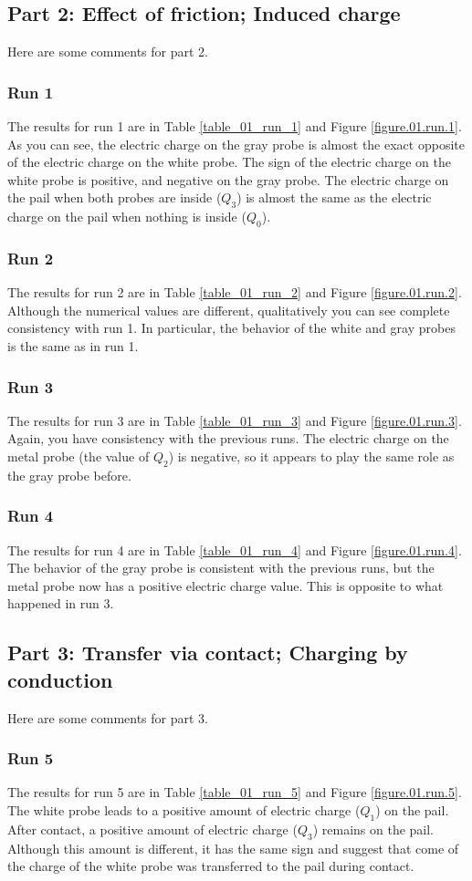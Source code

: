 \subsection{Part 2: Effect of friction; Induced charge}
%
Here are some comments for part 2.
%
\subsubsection{Run 1}
%
The results for run 1 are in Table \ref{table_01_run_1} and Figure \ref{figure.01.run.1}. As you can see, the electric charge on the gray probe is almost the exact opposite of the electric charge on the white probe. The sign of the electric charge on the white probe is positive, and negative on the gray probe. The electric charge on the pail when both probes are inside ($Q_{3}$) is almost the same as the electric charge on the pail when nothing is inside ($Q_{0}$).
%
\subsubsection{Run 2}
%
The results for run 2 are in Table \ref{table_01_run_2} and Figure \ref{figure.01.run.2}. Although the numerical values are different, qualitatively you can see complete consistency with run 1. In particular, the behavior of the white and gray probes is the same as in run 1.
%
\subsubsection{Run 3}
%
The results for run 3 are in Table \ref{table_01_run_3} and Figure \ref{figure.01.run.3}. Again, you have consistency with the previous runs. The electric charge on the metal probe (the value of $Q_{2}$) is negative, so it appears to play the same role as the gray probe before.
%
\subsubsection{Run 4}
%
The results for run 4 are in Table \ref{table_01_run_4} and Figure \ref{figure.01.run.4}. The behavior of the gray probe is consistent with the previous runs, but the metal probe now has a positive electric charge value. This is opposite to what happened in run 3.
%
\subsection{Part 3: Transfer via contact; Charging by conduction}
%
Here are some comments for part 3.
%
\subsubsection{Run 5}
%
The results for run 5 are in Table \ref{table_01_run_5} and Figure \ref{figure.01.run.5}. The white probe leads to a positive amount of electric charge ($Q_{1}$) on the pail. After contact, a positive amount of electric charge ($Q_{3}$) remains on the pail. Although this amount is different, it has the same sign and suggest that come of the charge of the white probe was transferred to the pail during contact.
%
